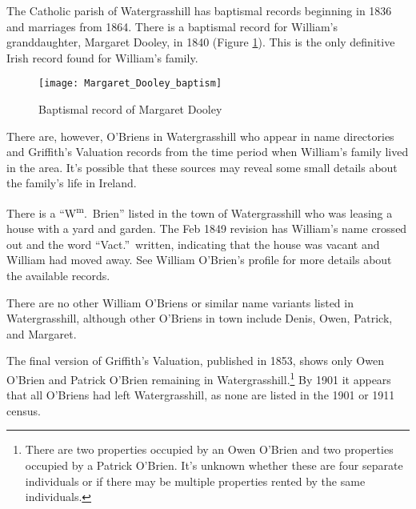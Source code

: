 {{The Catholic parish of Watergrasshill has baptismal records beginning in 1836 and marriages from 1864.\cite{ParishRecords} There is a baptismal record for William's granddaughter, Margaret Dooley, in 1840 (Figure \ref{fig:DooleyBaptism}). This is the only definitive Irish record found for William's family.\cite{Margaret3DooleyBaptism2}

\begin{figure}
	\centering
	\texttt{[image: Margaret\_Dooley\_baptism]}
	\caption{Baptismal record of Margaret Dooley}
	\label{fig:DooleyBaptism}
\end{figure}

There are, however, O'Briens in Watergrasshill who appear in name directories and Griffith's Valuation records from the time period when William's family lived in the area. It's possible that these sources may reveal some small details about the family's life in Ireland.

There is a ``W\textsuperscript{m}.\ Brien'' listed in the town of Watergrasshill who was leasing a house with a yard and garden.\cite{Valuation1849:1} The Feb 1849 revision has William's name crossed out and the word ``Vact.''\ written, indicating that the house was vacant and William had moved away.\cite{House1849} See William O'Brien's profile for more details about the available records.

There are no other William O'Briens or similar name variants listed in Watergrasshill, although other O'Briens in town include Denis,\cite{Valuation1849:2} Owen,\cite{Valuation1849:3} Patrick,\cite{Valuation1849:4} and Margaret.\cite{Valuation1849:5}

The final version of Griffith's Valuation, published in 1853, shows only Owen O'Brien\cite{Griffiths:46,Griffiths:90:1} and Patrick O'Bri\-en\cite{Griffiths:90:2} remaining in Watergrasshill.\footnote{There are two properties occupied by an Owen O'Brien and two properties occupied by a Patrick O'Brien. It's unknown whether these are four separate individuals or if there may be multiple properties rented by the same individuals.} By 1901 it appears that all O'Briens had left Watergrasshill, as none are listed in the 1901 or 1911 census.\cite{1901IrishCensus,1911IrishCensus}

}}
